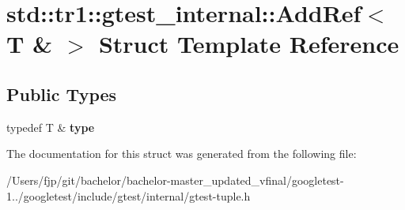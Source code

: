 \hypertarget{structstd_1_1tr1_1_1gtest__internal_1_1_add_ref_3_01_t_01_6_01_4}{}\section{std\+:\+:tr1\+:\+:gtest\+\_\+internal\+:\+:Add\+Ref$<$ T \& $>$ Struct Template Reference}
\label{structstd_1_1tr1_1_1gtest__internal_1_1_add_ref_3_01_t_01_6_01_4}
\subsection*{Public Types}
\begin{DoxyCompactItemize}
\item 
\mbox{\label{structstd_1_1tr1_1_1gtest__internal_1_1_add_ref_3_01_t_01_6_01_4_a9cb3b0992c2a9e7df42d01fb64c2dc88}} 
typedef T \& {\bfseries type}
\end{DoxyCompactItemize}


The documentation for this struct was generated from the following file\+:\begin{DoxyCompactItemize}
\item 
/\+Users/fjp/git/bachelor/bachelor-\/master\+\_\+updated\+\_\+vfinal/googletest-\/1../googletest/include/gtest/internal/gtest-\/tuple.\+h\end{DoxyCompactItemize}
